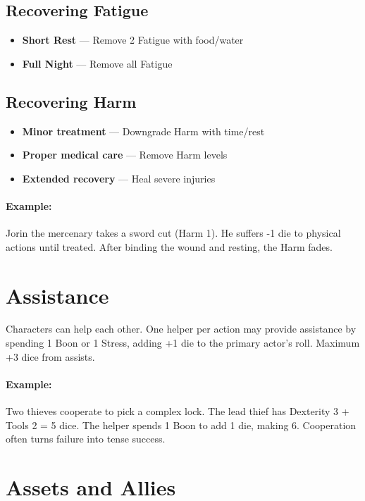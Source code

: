 \subsection*{Recovering Fatigue}
\begin{itemize}
  \item \textbf{Short Rest} — Remove 2 Fatigue with food/water
  \item \textbf{Full Night} — Remove all Fatigue
\end{itemize}

\subsection*{Recovering Harm}
\begin{itemize}
  \item \textbf{Minor treatment} — Downgrade Harm with time/rest
  \item \textbf{Proper medical care} — Remove Harm levels
  \item \textbf{Extended recovery} — Heal severe injuries
\end{itemize}

\paragraph{Example:}  
Jorin the mercenary takes a sword cut (Harm 1). He suffers -1 die to physical actions until treated. After binding the wound and resting, the Harm fades.

\section{Assistance} 

Characters can help each other. One helper per action may provide assistance by spending 1 Boon or 1 Stress, adding +1 die to the primary actor's roll. Maximum +3 dice from assists.

\paragraph{Example:}  
Two thieves cooperate to pick a complex lock. The lead thief has Dexterity 3 + Tools 2 = 5 dice. The helper spends 1 Boon to add 1 die, making 6. Cooperation often turns failure into tense success.

\section{Assets and Allies} 

